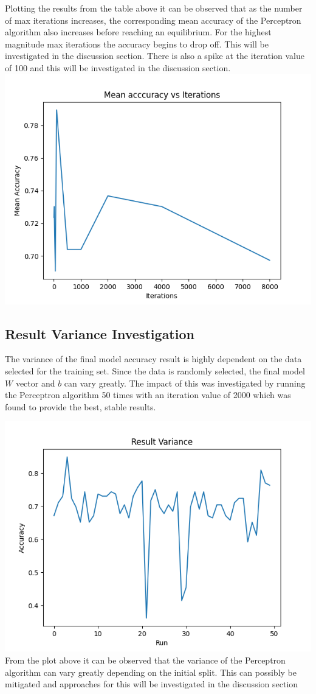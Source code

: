 \documentclass[10pt,twocolumn,letterpaper]{article}
\begin{document}
Plotting the results from the table above it can be observed that as the number of max iterations increases,
the corresponding mean accuracy of the Perceptron algorithm also increases before reaching an equilibrium.
For the highest magnitude max iterations the accuracy begins to drop off. This will be investigated in the
discussion section. There is also a spike at the iteration value of 100 and this will be investigated in the
discussion section.
\includegraphics[scale=0.6]{Figure_1.png}
\subsection{Result Variance Investigation}
The variance of the final model accuracy result is highly dependent on the data selected for the training set.
Since the data is randomly selected, the final model $W$ vector and $b$ can vary greatly. The impact of this
was investigated by running the Perceptron algorithm 50 times with an iteration value of 2000 which was found
to provide the best, stable results.

\includegraphics[scale=0.55]{Figure_2.png}
From the plot above it can be observed that the variance of the Perceptron algorithm can vary greatly depending
on the initial split. This can possibly be mitigated and approaches for this will be investigated in the
discussion section
\end{document}
